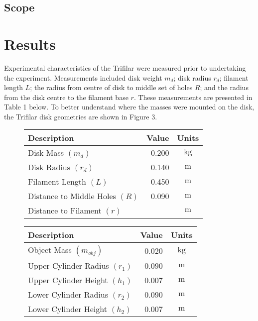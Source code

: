 \documentclass[a4paper]{article}
\begin{document}
\newpage

\subsection{Scope}



\section{Results}
Experimental characteristics of the Trifilar were measured prior to undertaking the experiment. Measurements included disk weight $m_d$; disk radius $r_d$; filament length $L$; the radius from centre of disk to middle set of holes $R$; and the radius from the disk centre to the filament base $r$. These measurements are presented in Table 1 below. To better understand where the masses were mounted on the disk, the Trifilar disk geometries are shown in Figure 3.

\begin{figure}[h]
	\centering
	\begin{minipage}{0.45\textwidth}
		\centering
		\begin{tabular}{lrc}
			\toprule
			Description & Value & Units \\
			\midrule
			Disk Mass $(m_d)$ & 0.200 & $\si{\kilogram}$\\
			Disk Radius $(r_d)$ & 0.140 & $\si{\meter}$ \\
			Filament Length $(L)$ & 0.450 & $\si{\meter}$ \\
			Distance to Middle Holes $(R)$ & 0.090 & $\si{\meter}$\\
			Distance to Filament $(r)$ &  & $\si{\meter}$ \\
			\bottomrule
		\end{tabular}
	\end{minipage}
	\hspace{1cm}
	\begin{minipage}{0.45\textwidth}
		\centering
		\begin{tabular}{lrc}
			\toprule
			Description & Value & Units \\
			\midrule
			Object Mass $(m_{obj})$ & 0.020 & $\si{\kilogram}$ \\
			Upper Cylinder Radius $(r_1)$ & 0.090 & $\si{\meter}$ \\
			Upper Cylinder Height $(h_1)$ & 0.007 & $\si{\meter}$ \\
			Lower Cylinder Radius $(r_2)$ & 0.090 & $\si{\meter}$ \\
			Lower Cylinder Height $(h_2)$ & 0.007 & $\si{\meter}$ \\
			\bottomrule
		\end{tabular}
	\end{minipage}
\end{figure}
\end{document}
